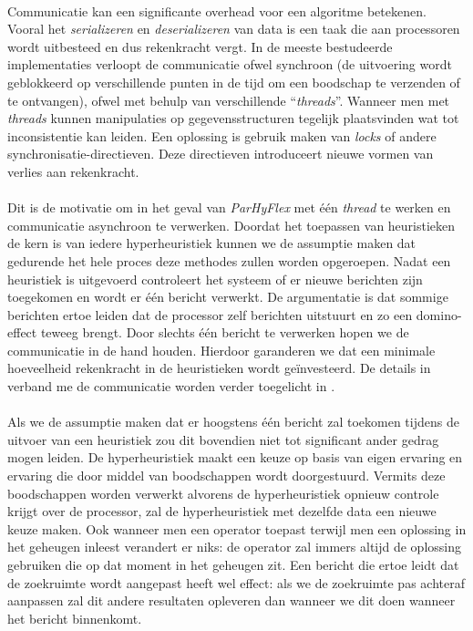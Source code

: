 \paragraph{}
Communicatie kan een significante overhead voor een algoritme betekenen. Vooral het \emph{serializeren} en \emph{deserializeren} van data is een taak die aan processoren wordt uitbesteed en dus rekenkracht vergt. In de meeste bestudeerde implementaties verloopt de communicatie ofwel synchroon (de uitvoering wordt geblokkeerd op verschillende punten in de tijd om een boodschap te verzenden of te ontvangen), ofwel met behulp van verschillende ``\emph{threads}''. Wanneer men met \emph{threads} kunnen manipulaties op gegevensstructuren tegelijk plaatsvinden wat tot inconsistentie kan leiden. Een oplossing is gebruik maken van \emph{locks} of andere synchronisatie-directieven. Deze directieven introduceert nieuwe vormen van verlies aan rekenkracht.

\paragraph{}
Dit is de motivatie om in het geval van \emph{ParHyFlex} met \'e\'en \emph{thread} te werken en communicatie asynchroon te verwerken. Doordat het toepassen van heuristieken de kern is van iedere hyperheuristiek kunnen we de assumptie maken dat gedurende het hele proces deze methodes zullen worden opgeroepen. Nadat een heuristiek is uitgevoerd controleert het systeem of er nieuwe berichten zijn toegekomen en wordt er \'e\'en bericht verwerkt. De argumentatie is dat sommige berichten ertoe leiden dat de processor zelf berichten uitstuurt en zo een domino-effect teweeg brengt. Door slechts \'e\'en bericht te verwerken hopen we de communicatie in de hand houden. Hierdoor garanderen we dat een minimale hoeveelheid rekenkracht in de heuristieken wordt ge\"investeerd. De details in verband me de communicatie worden verder toegelicht in .

\paragraph{}
Als we de assumptie maken dat er hoogstens \'e\'en bericht zal toekomen tijdens de uitvoer van een heuristiek zou dit bovendien niet tot significant ander gedrag mogen leiden. De hyperheuristiek maakt een keuze op basis van eigen ervaring en ervaring die door middel van boodschappen wordt doorgestuurd. Vermits deze boodschappen worden verwerkt alvorens de hyperheuristiek opnieuw controle krijgt over de processor, zal de hyperheuristiek met dezelfde data een nieuwe keuze maken. Ook wanneer men een operator toepast terwijl men een oplossing in het geheugen inleest verandert er niks: de operator zal immers altijd de oplossing gebruiken die op dat moment in het geheugen zit. Een bericht die ertoe leidt dat de zoekruimte wordt aangepast heeft wel effect: als we de zoekruimte pas achteraf aanpassen zal dit andere resultaten opleveren dan wanneer we dit doen wanneer het bericht binnenkomt.

